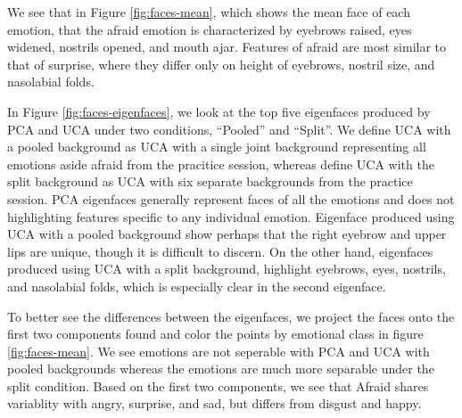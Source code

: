 \documentclass[12pt]{article}
\begin{document}
We see that in Figure \ref{fig:faces-mean}, which shows the mean face of each emotion, that the afraid emotion is characterized by eyebrows raised, eyes widened, nostrils opened, and mouth ajar. Features of afraid are most similar to that of surprise, where they differ only on height of eyebrows, nostril size, and nasolabial folds.

In Figure \ref{fig:faces-eigenfaces}, we look at the top five eigenfaces produced by PCA and UCA under two conditions, ``Pooled'' and ``Split''.
We define UCA with a pooled background as UCA with a single joint background representing all emotions aside afraid from the pracitice session, whereas define UCA with the split background as UCA with six separate backgrounds from the practice session. PCA eigenfaces generally represent faces of all the emotions and does not highlighting features specific to any individual emotion. Eigenface produced using UCA with a pooled background show perhaps that the right eyebrow and upper lips are unique, though it is difficult to discern. On the other hand, eigenfaces produced using UCA with a split background, highlight eyebrows, eyes, nostrils, and nasolabial folds, which is especially clear in the second eigenface.

To better see the differences between the eigenfaces, we project the faces onto the first two components found and color the points by emotional class in figure \ref{fig:faces-mean}.
We see emotions are not seperable with PCA and UCA with pooled backgrounds whereas the emotions are much more separable under the split condition. Based on the first two components, we see that Afraid shares variablity with angry, surprise, and sad, but differs from disgust and happy.


\end{document}

